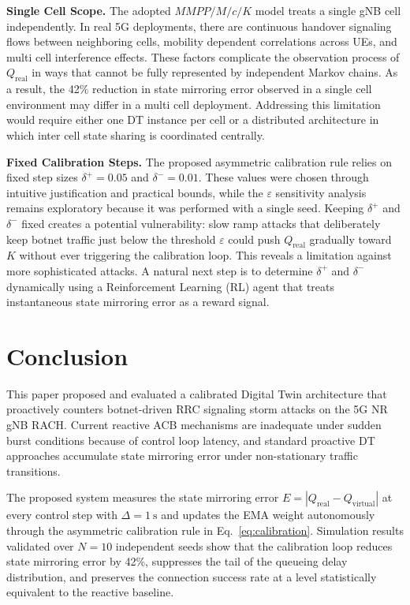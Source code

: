 \documentclass[conference]{IEEEtran}
\newcommand{\qreal}{Q_{\mathrm{real}}}
\newcommand{\qvirt}{Q_{\mathrm{virtual}}}
\begin{document}
\textbf{Single Cell Scope.} The adopted $MMPP/M/c/K$ model treats a single gNB cell independently. In real 5G deployments, there are continuous handover signaling flows between neighboring cells, mobility dependent correlations across UEs, and multi cell interference effects. These factors complicate the observation process of $\qreal$ in ways that cannot be fully represented by independent Markov chains. As a result, the 42\% reduction in state mirroring error observed in a single cell environment may differ in a multi cell deployment. Addressing this limitation would require either one DT instance per cell or a distributed architecture in which inter cell state sharing is coordinated centrally.

\textbf{Fixed Calibration Steps.} The proposed asymmetric calibration rule relies on fixed step sizes $\delta^{+} = 0.05$ and $\delta^{-} = 0.01$. These values were chosen through intuitive justification and practical bounds, while the $\varepsilon$ sensitivity analysis remains exploratory because it was performed with a single seed. Keeping $\delta^{+}$ and $\delta^{-}$ fixed creates a potential vulnerability: slow ramp attacks that deliberately keep botnet traffic just below the threshold $\varepsilon$ could push $\qreal$ gradually toward $K$ without ever triggering the calibration loop. This reveals a limitation against more sophisticated attacks. A natural next step is to determine $\delta^{+}$ and $\delta^{-}$ dynamically using a Reinforcement Learning (RL) agent that treats instantaneous state mirroring error as a reward signal.

\section{Conclusion}

This paper proposed and evaluated a calibrated Digital Twin architecture that proactively counters botnet-driven RRC signaling storm attacks on the 5G NR gNB RACH. Current reactive ACB mechanisms are inadequate under sudden burst conditions because of control loop latency, and standard proactive DT approaches accumulate state mirroring error under non-stationary traffic transitions.

The proposed system measures the state mirroring error $E = |\qreal - \qvirt|$ at every control step with $\Delta = 1\ \mathrm{s}$ and updates the EMA weight autonomously through the asymmetric calibration rule in Eq.~\eqref{eq:calibration}. Simulation results validated over $N=10$ independent seeds show that the calibration loop reduces state mirroring error by 42\%, suppresses the tail of the queueing delay distribution, and preserves the connection success rate at a level statistically equivalent to the reactive baseline.
\end{document}
